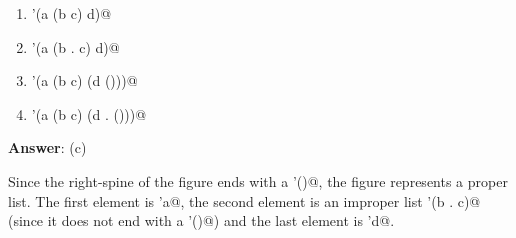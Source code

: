 \documentclass[12pt]{article}
\begin{document}
\begin{enumerate}
\begin{enumerate}
\item \verb@'(a (b c) d)@

\item \verb@'(a (b . c) d)@
  
\item \verb@'(a (b c) (d ()))@


\item \verb@'(a (b c) (d . ()))@

\end{enumerate}

\textbf{Answer}: (c)

Since the right-spine of the figure ends with a \verb@'()@, the
figure represents a proper list.  The first element is \verb@'a@,
the second element is an improper list \verb@'(b . c)@ (since it does
not end with a \verb@'()@) and the last element is \verb@'d@.

\end{enumerate}
\end{document}
